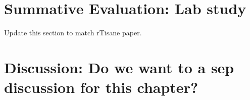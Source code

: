 \section{Summative Evaluation: Lab study}
{\color{orange} Update this section to match rTisane paper.}

\section{Discussion: Do we want to a sep discussion for this chapter?}
